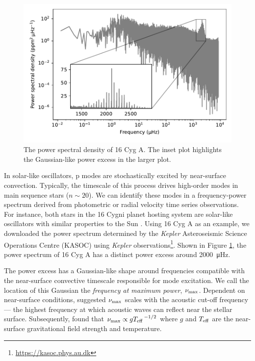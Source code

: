 \begin{figure}[tb]
    \centering
    \includegraphics{figures/seismo-psd.pdf}
    \caption[The power spectral density of 16 Cyg A.]{The power spectral density of 16 Cyg A. The inset plot highlights the Gaussian-like power excess in the larger plot.}
    \label{fig:seismo-psd}
\end{figure}

In solar-like oscillators, p modes are stochastically excited by near-surface convection. Typically, the timescale of this process drives high-order modes in main sequence stars (\(n \sim 20\)). We can identify these modes in a frequency-power spectrum derived from photometric or radial velocity time series observations. For instance, both stars in the 16 Cygni planet hosting system are solar-like oscillators with similar properties to the Sun \citep{Metcalfe.Chaplin.ea2012,Davies.Chaplin.ea2015,Metcalfe.Creevey.ea2014}. Using 16 Cyg A as an example, we downloaded the power spectrum determined by the \emph{Kepler} Asteroseismic Science Operations Centre (KASOC) using \emph{Kepler} observations\footnote{\url{https://kasoc.phys.au.dk}}. Shown in Figure \ref{fig:seismo-psd}, the power spectrum of 16 Cyg A has a distinct power excess around \SI{2000}{\micro\hertz}. 

The power excess has a Gaussian-like shape around frequencies compatible with the near-surface convective timescale responsible for mode excitation. We call the location of this Gaussian the \emph{frequency at maximum power}, \({\nu_\mathrm{max}}\). Dependent on near-surface conditions, \citet{Brown.Gilliland.ea1991} suggested \({\nu_\mathrm{max}}\) scales with the acoustic cut-off frequency --- the highest frequency at which acoustic waves can reflect near the stellar surface. Subsequently, \citet{Kjeldsen.Bedding1995} found that \({\nu_\mathrm{max}} \propto g{T_\mathrm{eff}}^{\,-1/2}\) where \(g\) and \({T_\mathrm{eff}}\) are the near-surface gravitational field strength and temperature.

